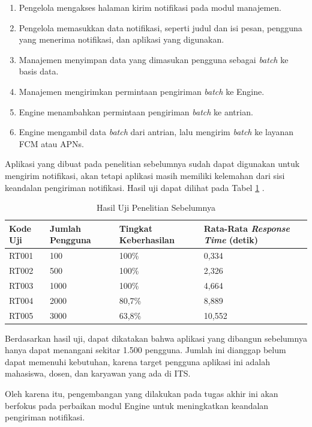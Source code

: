 \begin{enumerate}
	\item Pengelola mengakses halaman kirim notifikasi pada modul manajemen.
	\item Pengelola memasukkan data notifikasi, seperti judul dan isi pesan, pengguna yang menerima notifikasi, dan aplikasi yang digunakan.
	\item Manajemen menyimpan data yang dimasukan pengguna sebagai \textit{batch} ke basis data.
	\item Manajemen mengirimkan permintaan pengiriman \textit{batch} ke Engine.
	\item Engine menambahkan permintaan pengiriman \textit{batch} ke antrian.
	\item Engine mengambil data \textit{batch} dari antrian, lalu mengirim \textit{batch} ke layanan FCM atau APNs.
\end{enumerate}
\par Aplikasi yang dibuat pada penelitian sebelumnya sudah dapat digunakan untuk mengirim notifikasi, akan tetapi aplikasi masih memiliki kelemahan dari sisi keandalan pengiriman notifikasi. Hasil uji dapat dilihat pada Tabel \ref{t:hasil_uji_sebelum} \cite{application-thesis}.
\begin{longtable}{|p{1.5cm}|p{2cm}|p{2cm}|p{2.5cm}|}
	\caption{Hasil Uji Penelitian Sebelumnya} \label{t:hasil_uji_sebelum} \\ \hline
	\rowcolor{lightgray} Kode Uji & Jumlah Pengguna & Tingkat Keberhasilan & Rata-Rata \textit{Response Time} (detik) \\ \hline
	\endhead
	RT001 & 100 & 100\% & 0,334 \\ \hline
	RT002 & 500 & 100\% & 2,326 \\ \hline
	RT003 & 1000 & 100\% & 4,664 \\ \hline
	RT004 & 2000 & 80,7\% & 8,889 \\ \hline
	RT005 & 3000 & 63,8\% & 10,552 \\ \hline
\end{longtable}
\par Berdasarkan hasil uji, dapat dikatakan bahwa aplikasi yang dibangun sebelumnya hanya dapat menangani sekitar 1.500 pengguna. Jumlah ini dianggap belum dapat memenuhi kebutuhan, karena target pengguna aplikasi ini adalah mahasiswa, dosen, dan karyawan yang ada di ITS.
\par Oleh karena itu, pengembangan yang dilakukan pada tugas akhir ini akan berfokus pada perbaikan modul Engine untuk meningkatkan keandalan pengiriman notifikasi.


